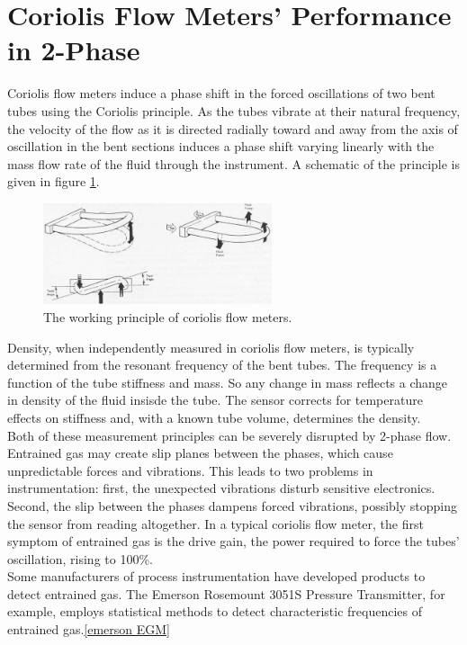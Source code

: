 \documentclass{report}
\begin{document}
\section{Coriolis Flow Meters' Performance in 2-Phase}
Coriolis flow meters induce a phase shift in the forced oscillations of two bent tubes using the Coriolis principle. As the tubes vibrate at their natural frequency, the velocity of the flow as it is directed radially toward and away from the axis of oscillation in the bent sections induces a phase shift varying linearly with the mass flow rate of the fluid through the instrument. \cite{O'Banion 2013} A schematic of the principle is given in figure \ref{fig:coriolis}. \\
\begin{figure}
\includegraphics[width=0.6\textwidth]{coriolis}
\caption{The working principle of coriolis flow meters. \cite{coriolis}}%
\label{fig:coriolis}
\end{figure}
Density, when independently measured in coriolis flow meters, is typically determined from the resonant frequency of the bent tubes. \cite{O'Banion 2013} The frequency is a function of the tube stiffness and mass. So any change in mass reflects a change in density of the fluid insisde the tube. The sensor corrects for temperature effects on stiffness and, with a known tube volume, determines the density.\\
Both of these measurement principles can be severely disrupted by 2-phase flow. Entrained gas may create slip planes between the phases, which cause unpredictable forces and vibrations.\cite{ISO}\cite{processArticle} This leads to two problems in instrumentation: first, the unexpected vibrations disturb sensitive electronics. Second, the slip between the phases dampens forced vibrations, possibly stopping the sensor from reading altogether. In a typical coriolis flow meter, the first symptom of entrained gas is the drive gain, the power required to force the tubes' oscillation, rising to 100\%. \cite{ISO}\cite{emerson youtube}\\
Some manufacturers of process instrumentation have developed products to detect entrained gas. The Emerson Rosemount 3051S Pressure Transmitter, for example, employs statistical methods to detect characteristic frequencies of entrained gas.\ref{emerson EGM}\\
\end{document}
